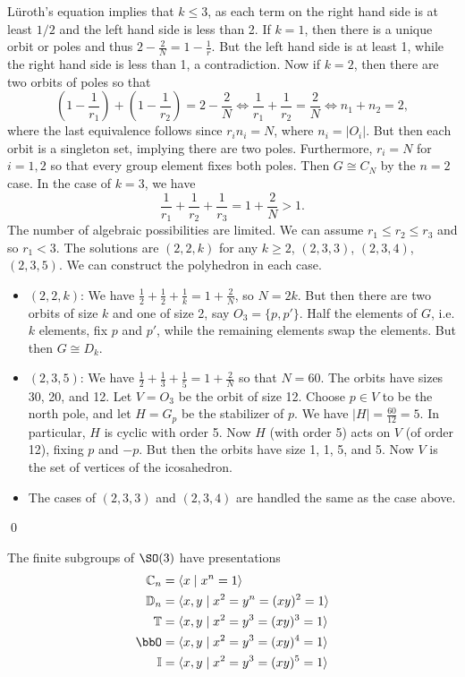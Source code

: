 L\"uroth's equation implies that $k \leq 3$, as each term on the right hand side is at least $1/2$ and the left hand side is less than 2. If $k=1$, then there is a unique orbit or poles and thus $2- \frac{2}{N}= 1- \frac{1}{r}$. But the left hand side is at least 1, while the right hand side is less than 1, a contradiction. Now if $k=2$, then there are two orbits of poles so that
	\[
	\left(1-\dfrac{1}{r_1}\right) + \left(1-\dfrac{1}{r_2}\right)= 2-\dfrac{2}{N} \Longleftrightarrow \dfrac{1}{r_1} + \dfrac{1}{r_2} = \dfrac{2}{N} \Longleftrightarrow n_1+n_2 =2,
	\]
where the last equivalence follows since $r_in_i=N$, where $n_i=|O_i|$. But then each orbit is a singleton set, implying there are two poles. Furthermore, $r_i=N$ for $i=1,2$ so that every group element fixes both poles. Then $G \cong C_N$ by the $n=2$ case. In the case of $k=3$, we have
	\[
	\dfrac{1}{r_1} + \dfrac{1}{r_2} + \dfrac{1}{r_3} = 1 + \dfrac{2}{N}>1.
	\]
The number of algebraic possibilities are limited. We can assume $r_1 \leq r_2 \leq r_3$ and so $r_1<3$. The solutions are $(2,2,k)$ for any $k \geq 2$, $(2,3,3)$, $(2,3,4)$, $(2,3,5)$. We can construct the polyhedron in each case. 
	\begin{itemize}
	\item  $(2,2,k)$: \enskip We have $\frac{1}{2}+\frac{1}{2}+\frac{1}{k}=1+\frac{2}{N}$, so $N=2k$. But then there are two orbits of size $k$ and one of size 2, say $O_3=\{p,p' \}$. Half the elements of $G$, i.e. $k$ elements, fix $p$ and $p'$, while the remaining elements swap the elements. But then $G \cong D_k$.  
	\item $(2,3,5)$: \enskip We have $\frac{1}{2}+\frac{1}{3}+\frac{1}{5}=1+\frac{2}{N}$ so that $N=60$. The orbits have sizes 30, 20, and 12. Let $V=O_3$ be the orbit of size 12. Choose $p \in V$ to be the north pole, and let $H=G_p$ be the stabilizer of $p$. We have $|H|= \frac{60}{12}=5$. In particular, $H$ is cyclic with order 5. Now $H$ (with order 5) acts on $V$ (of order 12), fixing $p$ and $-p$. But then the orbits have size 1, 1, 5, and 5. Now $V$ is the set of vertices of the icosahedron. 
	\item The cases of $(2,3,3)$ and $(2,3,4)$ are handled the same as the case above. 
	\end{itemize}
\qed \\


\begin{cor}
The finite subgroups of $\SO(3)$ have presentations 
	\[
	\begin{split}
	\mathbb{C}_n&= \langle x \;|\; x^n=1 \rangle \\
	\mathbb{D}_n&= \langle x,y \;|\; x^2=y^n=(xy)^2=1 \rangle \\
	\mathbb{T}&= \langle x,y \;|\; x^2=y^3=(xy)^3=1 \rangle \\
	\bbO&= \langle x,y \;|\; x^2=y^3=(xy)^4=1 \rangle \\
	\mathbb{I}&= \langle x,y \;|\; x^2=y^3=(xy)^5=1 \rangle
	\end{split}
	\]
\end{cor}

